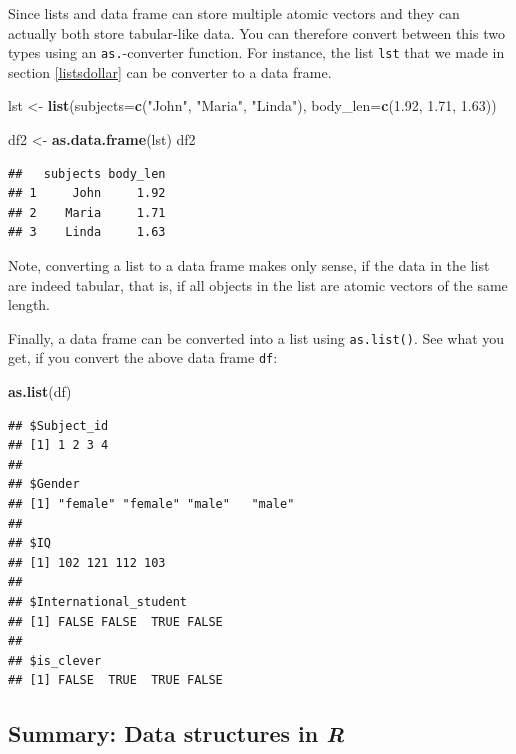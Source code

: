 \documentclass[
]{scrartcl}
\newenvironment{Shaded}{\begin{snugshade}}{\end{snugshade}}
\newcommand{\AttributeTok}[1]{\textcolor[rgb]{0.13,0.29,0.53}{#1}}
\newcommand{\FloatTok}[1]{\textcolor[rgb]{0.00,0.00,0.81}{#1}}
\newcommand{\FunctionTok}[1]{\textcolor[rgb]{0.13,0.29,0.53}{\textbf{#1}}}
\newcommand{\NormalTok}[1]{#1}
\newcommand{\OtherTok}[1]{\textcolor[rgb]{0.56,0.35,0.01}{#1}}
\newcommand{\StringTok}[1]{\textcolor[rgb]{0.31,0.60,0.02}{#1}}
\begin{document}
Since lists and data frame can store multiple atomic vectors and they can actually both store tabular-like data. You can therefore convert between this two types using an \texttt{as.}-converter function. For instance, the list \texttt{lst} that we made in section \ref{listsdollar} can be converter to a data frame.

\begin{Shaded}
\begin{Highlighting}[]
\NormalTok{lst }\OtherTok{\textless{}{-}} \FunctionTok{list}\NormalTok{(}\AttributeTok{subjects=}\FunctionTok{c}\NormalTok{(}\StringTok{"John"}\NormalTok{, }\StringTok{"Maria"}\NormalTok{, }\StringTok{"Linda"}\NormalTok{),}
            \AttributeTok{body\_len=}\FunctionTok{c}\NormalTok{(}\FloatTok{1.92}\NormalTok{, }\FloatTok{1.71}\NormalTok{, }\FloatTok{1.63}\NormalTok{))}

\NormalTok{df2 }\OtherTok{\textless{}{-}} \FunctionTok{as.data.frame}\NormalTok{(lst)}
\NormalTok{df2}
\end{Highlighting}
\end{Shaded}

\begin{verbatim}
##   subjects body_len
## 1     John     1.92
## 2    Maria     1.71
## 3    Linda     1.63
\end{verbatim}

Note, converting a list to a data frame makes only sense, if the data in the list are indeed tabular, that is, if all objects in the list are atomic vectors of the same length.

Finally, a data frame can be converted into a list using \texttt{as.list()}. See what you get, if you convert the above data frame \texttt{df}:

\begin{Shaded}
\begin{Highlighting}[]
\FunctionTok{as.list}\NormalTok{(df)}
\end{Highlighting}
\end{Shaded}

\begin{verbatim}
## $Subject_id
## [1] 1 2 3 4
## 
## $Gender
## [1] "female" "female" "male"   "male"  
## 
## $IQ
## [1] 102 121 112 103
## 
## $International_student
## [1] FALSE FALSE  TRUE FALSE
## 
## $is_clever
## [1] FALSE  TRUE  TRUE FALSE
\end{verbatim}

\subsection{\texorpdfstring{Summary: Data structures in \emph{R}}{Summary: Data structures in R}}\label{summary-data-structures-in-r}
\end{document}
